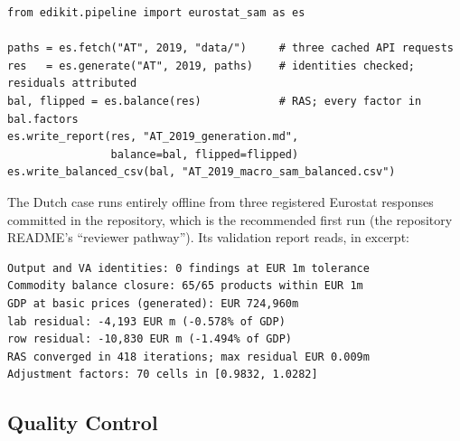 \documentclass[11pt,a4paper]{article}
\begin{document}
{\small
\begin{verbatim}
from edikit.pipeline import eurostat_sam as es

paths = es.fetch("AT", 2019, "data/")     # three cached API requests
res   = es.generate("AT", 2019, paths)    # identities checked; residuals attributed
bal, flipped = es.balance(res)            # RAS; every factor in bal.factors
es.write_report(res, "AT_2019_generation.md",
                balance=bal, flipped=flipped)
es.write_balanced_csv(bal, "AT_2019_macro_sam_balanced.csv")
\end{verbatim}}

\noindent The Dutch case runs entirely offline from three registered
Eurostat responses committed in the repository, which is the recommended
first run (the repository README's ``reviewer pathway''). Its validation
report reads, in excerpt:

{\small
\begin{verbatim}
Output and VA identities: 0 findings at EUR 1m tolerance
Commodity balance closure: 65/65 products within EUR 1m
GDP at basic prices (generated): EUR 724,960m
lab residual: -4,193 EUR m (-0.578% of GDP)
row residual: -10,830 EUR m (-1.494% of GDP)
RAS converged in 418 iterations; max residual EUR 0.009m
Adjustment factors: 70 cells in [0.9832, 1.0282]
\end{verbatim}}

\subsection{Quality Control}
\end{document}
